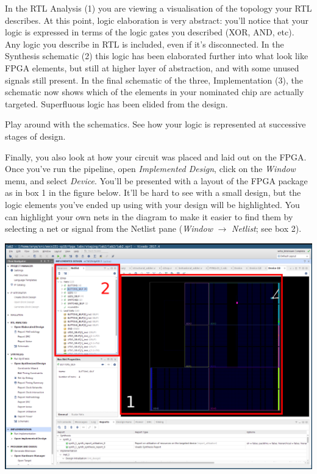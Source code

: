 \documentclass[11pt]{article}
\begin{document}
In the RTL Analysis (1) you are viewing a visualisation of the topology your RTL describes. At this point, logic elaboration is very abstract: you'll notice that your logic is expressed in terms of the logic gates you described (XOR, AND, etc). Any logic you describe in RTL is included, even if it's disconnected. In the Synthesis schematic (2) this logic has been elaborated further into what look like FPGA elements, but still at higher layer of abstraction, and with some unused signals still present. In the final schematic of the three, Implementation (3), the schematic now shows which of the elements in your nominated chip are actually targeted. Superfluous logic has been elided from the design.

Play around with the schematics. See how your logic is represented at successive stages of design.

Finally, you also look at how your circuit was placed and laid out on the FPGA. Once you've run the pipeline, open \emph{Implemented Design}, click on the \emph{Window} menu, and select \emph{Device}. You'll be presented with a layout of the FPGA package as in box 1 in the figure below. It'll be hard to see with a small design, but the logic elements you've ended up using with your design will be highlighted. You can highlight your own nets in the diagram to make it easier to find them by selecting a net or signal from the Netlist pane (\emph{Window} $\rightarrow$ \emph{Netlist}; see box 2).

\begin{center}
  \includegraphics[width=\textwidth]{figs/fpga_layout.png}
\end{center}
\end{document}
